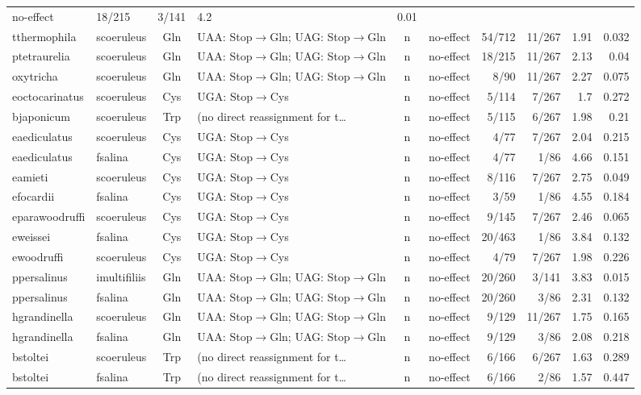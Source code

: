 \documentclass[preprint,11pt,authoryear,a4paper]{elsarticle}
\begin{document}
\begin{longtable}[]{@{}llclccrrrr@{}}
no-effect & 18/215 & 3/141 & 4.2 & 0.01 \\
tthermophila & scoeruleus & Gln & UAA: Stop\ensuremath{\to}{}Gln; UAG: Stop\ensuremath{\to}{}Gln & n &
no-effect & 54/712 & 11/267 & 1.91 & 0.032 \\
ptetraurelia & scoeruleus & Gln & UAA: Stop\ensuremath{\to}{}Gln; UAG: Stop\ensuremath{\to}{}Gln & n &
no-effect & 18/215 & 11/267 & 2.13 & 0.04 \\
oxytricha & scoeruleus & Gln & UAA: Stop\ensuremath{\to}{}Gln; UAG: Stop\ensuremath{\to}{}Gln & n &
no-effect & 8/90 & 11/267 & 2.27 & 0.075 \\
eoctocarinatus & scoeruleus & Cys & UGA: Stop\ensuremath{\to}{}Cys & n & no-effect &
5/114 & 7/267 & 1.7 & 0.272 \\
bjaponicum & scoeruleus & Trp & (no direct reassignment for t\ldots{} &
n & no-effect & 5/115 & 6/267 & 1.98 & 0.21 \\
eaediculatus & scoeruleus & Cys & UGA: Stop\ensuremath{\to}{}Cys & n & no-effect & 4/77 &
7/267 & 2.04 & 0.215 \\
eaediculatus & fsalina & Cys & UGA: Stop\ensuremath{\to}{}Cys & n & no-effect & 4/77 &
1/86 & 4.66 & 0.151 \\
eamieti & scoeruleus & Cys & UGA: Stop\ensuremath{\to}{}Cys & n & no-effect & 8/116 &
7/267 & 2.75 & 0.049 \\
efocardii & fsalina & Cys & UGA: Stop\ensuremath{\to}{}Cys & n & no-effect & 3/59 & 1/86
& 4.55 & 0.184 \\
eparawoodruffi & scoeruleus & Cys & UGA: Stop\ensuremath{\to}{}Cys & n & no-effect &
9/145 & 7/267 & 2.46 & 0.065 \\
eweissei & fsalina & Cys & UGA: Stop\ensuremath{\to}{}Cys & n & no-effect & 20/463 & 1/86
& 3.84 & 0.132 \\
ewoodruffi & scoeruleus & Cys & UGA: Stop\ensuremath{\to}{}Cys & n & no-effect & 4/79 &
7/267 & 1.98 & 0.226 \\
ppersalinus & imultifiliis & Gln & UAA: Stop\ensuremath{\to}{}Gln; UAG: Stop\ensuremath{\to}{}Gln & n &
no-effect & 20/260 & 3/141 & 3.83 & 0.015 \\
ppersalinus & fsalina & Gln & UAA: Stop\ensuremath{\to}{}Gln; UAG: Stop\ensuremath{\to}{}Gln & n &
no-effect & 20/260 & 3/86 & 2.31 & 0.132 \\
hgrandinella & scoeruleus & Gln & UAA: Stop\ensuremath{\to}{}Gln; UAG: Stop\ensuremath{\to}{}Gln & n &
no-effect & 9/129 & 11/267 & 1.75 & 0.165 \\
hgrandinella & fsalina & Gln & UAA: Stop\ensuremath{\to}{}Gln; UAG: Stop\ensuremath{\to}{}Gln & n &
no-effect & 9/129 & 3/86 & 2.08 & 0.218 \\
bstoltei & scoeruleus & Trp & (no direct reassignment for t\ldots{} & n
& no-effect & 6/166 & 6/267 & 1.63 & 0.289 \\
bstoltei & fsalina & Trp & (no direct reassignment for t\ldots{} & n &
no-effect & 6/166 & 2/86 & 1.57 & 0.447 \\
\end{longtable}
\end{document}

